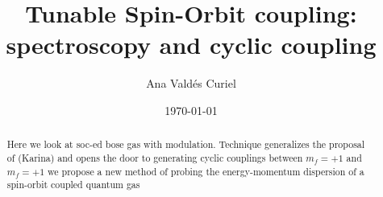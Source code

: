 \documentclass[twocolumn,amsmath,amssymb,floatfix,pra,]{revtex4}
\begin{document}
	
\title{Tunable Spin-Orbit coupling: spectroscopy and cyclic coupling}
	
\author{Ana Vald\'es Curiel}
\date{\today}

\begin{abstract}
	Here we look at soc-ed bose gas with modulation. Technique generalizes the proposal of (Karina) and opens the door to generating cyclic couplings between $m_f=+1$ and $m_f=+1$ we propose a new method of probing the energy-momentum dispersion of a spin-orbit coupled quantum gas
\end{abstract}

\maketitle


%











%

%

%

%

%

%


 



\end{document}
